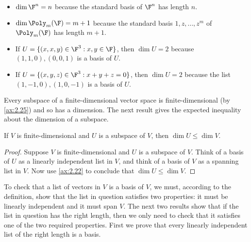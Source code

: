 \begin{example}[Dimensions]\label{ax:2.36}\leavevmode
\begin{itemize}
\item $\dim\F^n=n$ because the standard basis of $\F^n$ has length $n$.
\item $\dim\Poly_m(\F)=m+1$ because the standard basis $1,z,\dots,z^m$ of
  $\Poly_m(\F)$ has length $m+1$.
\item If $U=\{(x,x,y)\in\F^3 : x,y\in\F\}$, then $\dim U=2$ because
  $(1,1,0),(0,0,1)$ is a basis of $U$.
\item If $U=\{(x,y,z)\in\F^3 : x+y+z=0\}$, then $\dim U=2$ because the list
  $(1,-1,0),(1,0,-1)$ is a basis of $U$.
\end{itemize}
\end{example}

Every subspace of a finite-dimensional vector space is finite-dimensional
(by \ref{ax:2.25}) and so has a dimension. The next result gives the expected
inequality about the dimension of a subspace.

\begin{result}\label{ax:2.37}
If $V$ is finite-dimensional and $U$ is a subspace of $V$, then
$\dim U\le\dim V$.
\end{result}

\begin{proof}
Suppose $V$ is finite-dimensional and $U$ is a subspace of $V$. Think of a basis
of $U$ as a linearly independent list in $V$, and think of a basis of $V$ as a
spanning list in $V$. Now use \ref{ax:2.22} to conclude that
$\dim U\le\dim V$.
\end{proof}

%
To check that a list of vectors in $V$ is a basis of $V$, we must, according to
the definition, show that the list in question satisfies two properties: it
must be linearly independent and it must span $V$. The next two results show
that if the list in question has the right length, then we only need to check
that it satisfies one of the two required properties. First we prove that every
linearly independent list of the right length is a basis.

